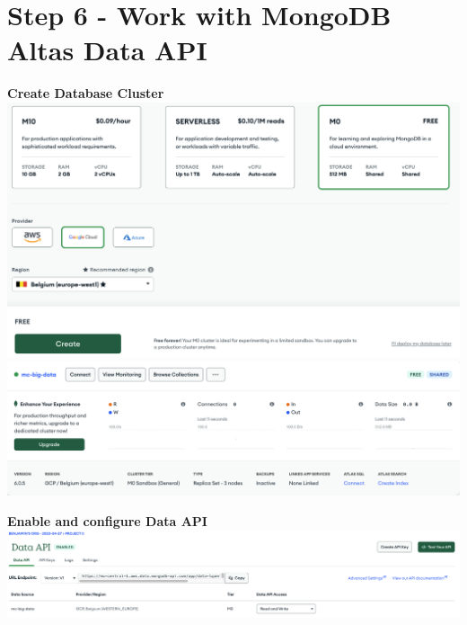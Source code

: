 \documentclass[14pt,a4paper]{extarticle}
\begin{document}
	\newpage

	\section*{Step 6 - Work with MongoDB Altas Data API}
	\noindent \textbf{Create Database Cluster} \\
	\includegraphics[width=\textwidth]{images/sc01.png}
	\includegraphics[width=\textwidth]{images/sc02.png}

	\vspace{1cm}

	\noindent \textbf{Enable and configure Data API} \\
	\includegraphics[width=\textwidth]{images/sc03.png}

	\newpage
\end{document}
